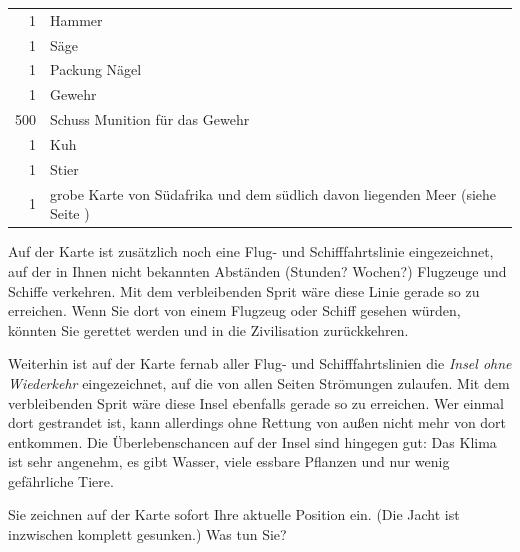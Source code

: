 \vspace*{.5em}
\begin{tabular}{rp{30em}}
  1 & Hammer \\
  1 & Säge \\
  1 & Packung Nägel \\
  1 & Gewehr \\
  500 & Schuss Munition für das Gewehr \\
  1 & Kuh \\
  1 & Stier \\
  1 & grobe Karte von Südafrika und dem südlich davon liegenden Meer (siehe Seite \pageref{wiederkehr-karte}) \\
\end{tabular}
\vspace*{.5em}

Auf der Karte ist zusätzlich noch eine Flug- und Schifffahrtslinie eingezeichnet, auf der in Ihnen nicht bekannten Abständen (Stunden? Wochen?) Flugzeuge und Schiffe verkehren. Mit dem verbleibenden Sprit wäre diese Linie gerade so zu erreichen. Wenn Sie dort von einem Flugzeug oder Schiff gesehen würden, könnten Sie gerettet werden und in die Zivilisation zurückkehren.

Weiterhin ist auf der Karte fernab aller Flug- und Schifffahrtslinien die \emph{Insel ohne Wiederkehr} eingezeichnet, auf die von allen Seiten Strömungen zulaufen. Mit dem verbleibenden Sprit wäre diese Insel ebenfalls gerade so zu erreichen. Wer einmal dort gestrandet ist, kann allerdings ohne Rettung von außen nicht mehr von dort entkommen. Die Überlebenschancen auf der Insel sind hingegen gut: Das Klima ist sehr angenehm, es gibt Wasser, viele essbare Pflanzen und nur wenig gefährliche Tiere.

Sie zeichnen auf der Karte sofort Ihre aktuelle Position ein. (Die Jacht ist inzwischen komplett gesunken.) Was tun Sie?

\pagebreak
